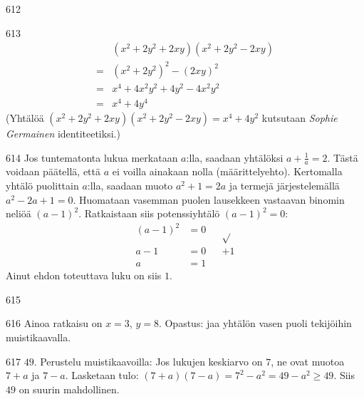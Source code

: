 \begin{Vastaus}{612}
    
\end{Vastaus}
\begin{Vastaus}{613}
	\begin{align*}
		&(x^2+2y^2+2xy)(x^2+2y^2-2xy) \\
		=&(x^2+2y^2)^2-(2xy)^2 \\
		=&x^4+4x^2y^2+4y^2-4x^2y^2 \\
		=&x^4+4y^4
	\end{align*}
	(Yhtälöä $(x^2+2y^2+2xy)(x^2+2y^2-2xy)=x^4+4y^2$ kutsutaan \textit{Sophie Germainen} identiteetiksi.)
	
\end{Vastaus}
\begin{Vastaus}{614}
	Jos tuntematonta lukua merkataan $a$:lla, saadaan yhtälöksi $a+\frac{1}{a}=2$. Tästä voidaan päätellä, että $a$ ei voilla ainakaan nolla (määrittelyehto). Kertomalla yhtälö puolittain $a$:lla, saadaan muoto $a^2+1=2a$ ja termejä järjestelemällä $a^2-2a+1=0$. Huomataan vasemman puolen lausekkeen vastaavan binomin neliöä $(a-1)^2$. Ratkaistaan siis potenssiyhtälö $(a-1)^2=0$:
	\begin{align*}
(a-1)^2&=0 &&\sqrt{ } \\
a-1&=0 &&+1 \\
a&=1 &&
	\end{align*}
	Ainut ehdon toteuttava luku on siis $1$.
	
\end{Vastaus}
\begin{Vastaus}{615}
    
\end{Vastaus}
\begin{Vastaus}{616}
    Ainoa ratkaisu on $x = 3$, $y=8$. Opastus: jaa yhtälön vasen puoli tekijöihin muistikaavalla.
    
\end{Vastaus}
\begin{Vastaus}{617}
        $49$. Perustelu muistikaavoilla: Jos lukujen keskiarvo on $7$, ne ovat muotoa $7+a$ ja $7-a$. Lasketaan tulo: $(7+a)(7-a)=7^2-a^2 = 49-a^2 \geq 49$. Siis $49$ on suurin mahdollinen.
    
\end{Vastaus}
